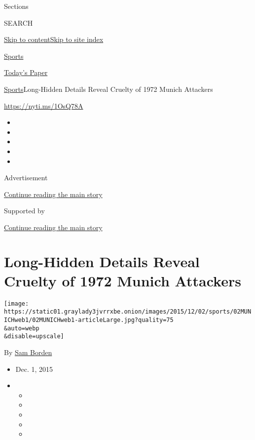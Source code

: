 Sections

SEARCH

\protect\hyperlink{site-content}{Skip to
content}\protect\hyperlink{site-index}{Skip to site index}

\href{https://www.nytimes3xbfgragh.onion/section/sports}{Sports}

\href{https://myaccount.nytimes3xbfgragh.onion/auth/login?response_type=cookie\&client_id=vi}{}

\href{https://www.nytimes3xbfgragh.onion/section/todayspaper}{Today's
Paper}

\href{/section/sports}{Sports}\textbar{}Long-Hidden Details Reveal
Cruelty of 1972 Munich Attackers

\url{https://nyti.ms/1OsQ78A}

\begin{itemize}
\item
\item
\item
\item
\item
\end{itemize}

Advertisement

\protect\hyperlink{after-top}{Continue reading the main story}

Supported by

\protect\hyperlink{after-sponsor}{Continue reading the main story}

\hypertarget{long-hidden-details-reveal-cruelty-of-1972-munich-attackers}{%
\section{Long-Hidden Details Reveal Cruelty of 1972 Munich
Attackers}\label{long-hidden-details-reveal-cruelty-of-1972-munich-attackers}}

\texttt{[image: https://static01.graylady3jvrrxbe.onion/images/2015/12/02/sports/02MUNICHweb1/02MUNICHweb1-articleLarge.jpg?quality=75\\\&auto=webp\\\&disable=upscale]}

By \href{http://www.nytimes3xbfgragh.onion/by/sam-borden}{Sam Borden}

\begin{itemize}
\item
  Dec. 1, 2015
\item
  \begin{itemize}
  \item
  \item
  \item
  \item
  \item
  \end{itemize}
\end{itemize}

